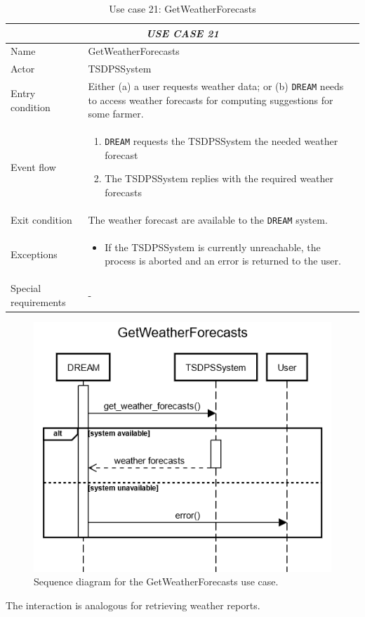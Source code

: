 \documentclass{article}
\begin{document}

\centering
\begin{longtable}{|p{3.5cm}|m{8cm}|}
\caption{Use case 21: GetWeatherForecasts}
 \label{uc21}
 \hline
 \multicolumn{2}{|c|}{\cellcolor{white}\emph{USE CASE 21}} \\
 \endfirsthead
 \endhead
 \endfoot
 \endlastfoot
 \hline
 Name & GetWeatherForecasts\\
 \hline
 Actor & TSDPSSystem\\
 \hline
 Entry condition & Either (a) a user requests weather data; or (b) \verb|DREAM| needs to access weather forecasts for computing suggestions for some farmer.\\
 \hline
 Event flow & \begin{enumerate}
    \item \verb|DREAM| requests the TSDPSSystem the needed weather forecast 
    \item The TSDPSSystem replies with the required weather forecasts 
 \end{enumerate}\\
 \hline
 Exit condition & The weather forecast are available to the \verb|DREAM| system.\\
 \hline
 Exceptions & \begin{itemize}
     \item If the TSDPSSystem is currently unreachable, the process is aborted and an error is returned to the user.
 \end{itemize}\\
 \hline
 Special requirements & - \\
 \hline
\end{longtable}
\begin{figure}[H]
    \centering
	\includegraphics[scale=0.5]{sequence_diagrams/GetWeatherForecasts.png}
    \caption{Sequence diagram for the GetWeatherForecasts use case.}
\end{figure}
The interaction is analogous for retrieving weather reports.
\newpage
\end{document}
